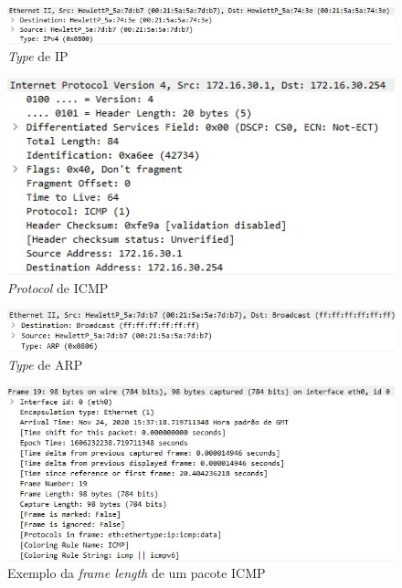 \documentclass[article, a4paper, 11pt, oneside]{memoir}
\begin{document}
\begin{figure}[htbp]  \label{exp1-ip-800}
  \centering        
  \includegraphics[scale=0.8]{img/exp1-ip-800.jpg}
  \caption{\textit{Type} de IP}
\end{figure}

\begin{figure}[htbp]  \label{exp1-icmp-1}
  \centering        
  \includegraphics[scale=0.8]{img/exp1-icmp-1.jpg}
  \caption{\textit{Protocol} de ICMP}
\end{figure}

\begin{figure}[htbp]  \label{exp1-arp-806}
  \centering        
  \includegraphics[scale=0.8]{img/exp1-arp-806.jpg}
  \caption{\textit{Type} de ARP}
\end{figure}

\begin{figure}[htbp]  \label{exp1-frame}
  \centering        
  \includegraphics[scale=0.8]{img/exp1-frame.jpg}
  \caption{Exemplo da \textit{frame length} de um pacote ICMP}
\end{figure}
\end{document}
